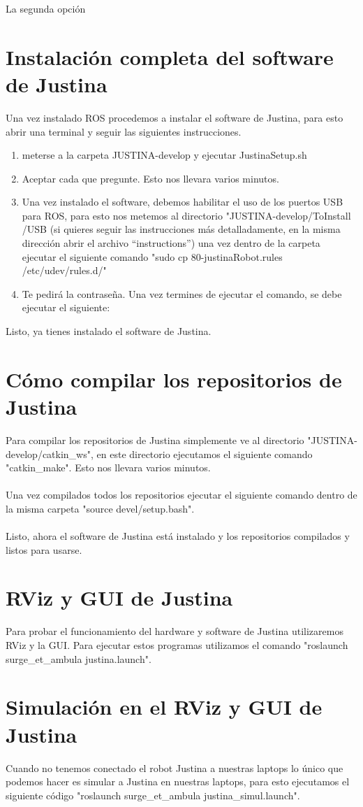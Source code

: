 \documentclass[user_manual.tex]{subfiles}
\begin{document}
 La segunda opción
 
\section{Instalación completa del software de Justina}
Una vez instalado ROS procedemos a instalar el software de Justina, para esto abrir una terminal y seguir las siguientes instrucciones.

\begin{enumerate}
 \item meterse a la carpeta JUSTINA-develop y ejecutar JustinaSetup.sh
 \item Aceptar cada que pregunte. Esto nos llevara varios minutos.
 \item Una vez instalado el software, debemos habilitar el uso de los puertos USB para ROS, para esto nos metemos al directorio "JUSTINA-develop/ToInstall
 /USB (si quieres seguir las instrucciones más detalladamente, en la misma dirección abrir el archivo ``instructions'') una vez dentro
 de la carpeta ejecutar el siguiente comando "sudo cp 80-justinaRobot.rules /etc/udev/rules.d/"
 \item Te pedirá la contraseña. Una vez termines de ejecutar el comando, se debe ejecutar el siguiente: %
\end{enumerate}
Listo, ya tienes instalado el software de Justina.

\section{Cómo compilar los repositorios de Justina}
Para compilar los repositorios de Justina simplemente ve al directorio "JUSTINA-develop/catkin\_ws", en este directorio ejecutamos el siguiente
comando "catkin\_make". Esto nos llevara varios minutos.\\
\\
Una vez compilados todos los repositorios ejecutar el siguiente comando dentro de la misma carpeta "source devel/setup.bash".\\
\\
Listo, ahora el software de Justina está instalado y los repositorios compilados y listos para usarse.

\section{RViz y GUI de Justina}
Para probar el funcionamiento del hardware y software de Justina utilizaremos RViz y la GUI. Para ejecutar estos programas utilizamos el 
comando "roslaunch surge\_et\_ambula justina.launch".
\section{Simulación en el RViz y GUI de Justina}
Cuando no tenemos conectado el robot Justina a nuestras laptops lo único que podemos hacer
es simular a Justina en nuestras laptops, para esto ejecutamos el siguiente código "roslaunch surge\_et\_ambula justina\_simul.launch".
\end{document}
